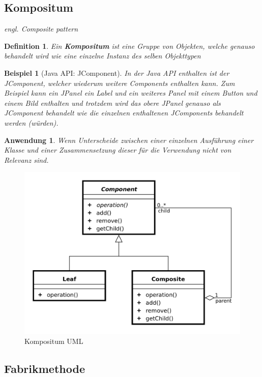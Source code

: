 \documentclass[a4paper]{article}
\theoremstyle{break}
\newtheorem{defi}{Definition}[section]
\newtheorem{ex}{Beispiel}[section]
\newtheorem{why}{Anwendung}[section]
\begin{document}
\newpage
\subsection{Kompositum}

\textit{engl. Composite pattern}

\begin{defi}
	Ein \textbf{Kompositum} ist eine Gruppe von Objekten, welche genauso behandelt wird wie eine einzelne Instanz des selben Objekttypen
\end{defi}

\begin{ex}[Java API: JComponent]
	In der Java API enthalten ist der JComponent, welcher wiederum weitere Components enthalten kann.
	Zum Beispiel kann ein JPanel ein Label und ein weiteres Panel mit einem Button und einem Bild enthalten und trotzdem wird das obere JPanel genauso als JComponent behandelt wie die einzelnen enthaltenen JComponents behandelt werden (würden).
\end{ex}

\begin{why}
	Wenn Unterscheide zwischen einer einzelnen Ausführung einer Klasse und einer Zusammensetzung dieser für die Verwendung nicht von Relevanz sind.
\end{why}
\begin{figure}[H]
	\centering
	\includegraphics[width=\textwidth]{../diagrams/uml/CompositePattern.png}
	\caption{Kompositum UML}
\end{figure}

\newpage
\subsection{Fabrikmethode}
\end{document}
